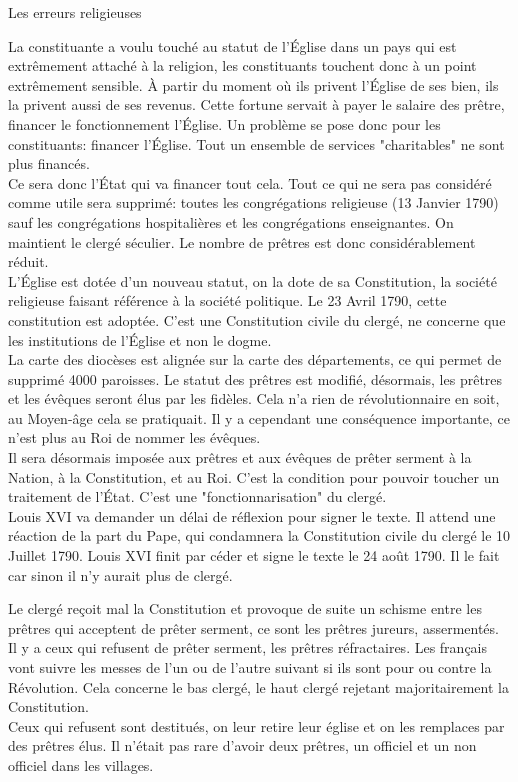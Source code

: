 \documentclass[10pt, a4paper, openany]{book}
\begin{document}
Les erreurs religieuses

La constituante a voulu touché au statut de l'Église dans un pays qui est extrêmement attaché à la religion, les constituants touchent donc à un point extrêmement sensible. À partir du moment où ils privent l'Église de ses bien, ils la privent aussi de ses revenus. Cette fortune servait à payer le salaire des prêtre, financer le fonctionnement l'Église. Un problème se pose donc pour les constituants: financer l'Église. Tout un ensemble de services "charitables" ne sont plus financés. \\
Ce sera donc l'État qui va financer tout cela. Tout ce qui ne sera pas considéré comme utile sera supprimé: toutes les congrégations religieuse (13 Janvier 1790) sauf les congrégations hospitalières et les congrégations enseignantes. On maintient le clergé séculier. Le nombre de prêtres est donc considérablement réduit. \\
L'Église est dotée d'un nouveau statut, on la dote de sa Constitution, la société religieuse faisant référence à la société politique. Le 23 Avril 1790, cette constitution est adoptée. C'est une Constitution civile du clergé, ne concerne que les institutions de l'Église et non le dogme. \\
La carte des diocèses est alignée sur la carte des départements, ce qui permet de supprimé 4000 paroisses. Le statut des prêtres est modifié, désormais, les prêtres et les évêques seront élus par les fidèles. Cela n'a rien de révolutionnaire en soit, au Moyen-âge cela se pratiquait. Il y a cependant une conséquence importante, ce n'est plus au Roi de nommer les évêques. \\
Il sera désormais imposée aux prêtres et aux évêques de prêter serment à la Nation, à la Constitution, et au Roi. C'est la condition pour pouvoir toucher un traitement de l'État. C'est une "fonctionnarisation" du clergé. \\
Louis XVI va demander un délai de réflexion pour signer le texte. Il attend une réaction de la part du Pape, qui condamnera la Constitution civile du clergé le 10 Juillet 1790. Louis XVI finit par céder et signe le texte le 24 août 1790. Il le fait car sinon il n'y aurait plus de clergé. 


Le clergé reçoit mal la Constitution et provoque de suite un schisme entre les prêtres qui acceptent de prêter serment, ce sont les prêtres jureurs, assermentés. Il y a ceux qui refusent de prêter serment, les prêtres réfractaires. Les français vont suivre les messes de l'un ou de l'autre suivant si ils sont pour ou contre la Révolution. Cela concerne le bas clergé, le haut clergé rejetant majoritairement la Constitution. \\
Ceux qui refusent sont destitués, on leur retire leur église et on les remplaces par des prêtres élus. Il n'était pas rare d'avoir deux prêtres, un officiel et un non officiel dans les villages. 
\end{document}
